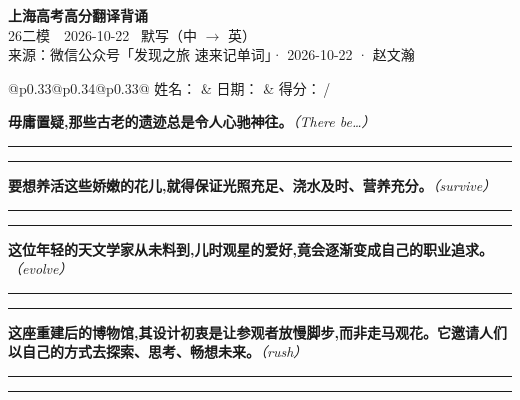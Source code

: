 \documentclass[11pt,a4paper]{article}
\newcommand{\num}[1]{\makebox[1.9em][r]{#1.}\hspace{0.3em}}
\newcommand{\wline}{\noindent\rule{\linewidth}{0.4pt}}
\newcommand{\prompt}[1]{\emph{\textcolor{tipblue}{\small（#1）}}}
\begin{document}
\pagestyle{plain}
\begin{center}
{\LARGE\bfseries 上海高考高分翻译背诵 }\\[0.25em]
{\large 26二模　2026-10-22 \quad\ 默写（中 $\to$ 英）}\\[0.35em]
{\footnotesize 来源：微信公众号「发现之旅 速来记单词」· 2026-10-22 · 赵文瀚}
\end{center}

\vspace{0.4em}
\noindent\begin{tabular}{@{}p{0.33\textwidth}@{}p{0.34\textwidth}@{}p{0.33\textwidth}@{}}
姓名：\underline{\hspace{2.0cm}} & 日期：\underline{\hspace{2.0cm}} & 得分：\underline{\hspace{1.4cm}}\,/ \\
\end{tabular}

\vspace{0.5em}

\vspace{0.8em}
\num{1}\textbf{毋庸置疑,那些古老的遗迹总是令人心驰神往。}\prompt{There be…}

\vspace{0.3em}

\wline\vspace{0.3em}
\wline

\num{2}\textbf{要想养活这些娇嫩的花儿,就得保证光照充足、浇水及时、营养充分。}\prompt{survive}

\vspace{0.3em}

\wline\vspace{0.3em}
\wline

\num{3}\textbf{这位年轻的天文学家从未料到,儿时观星的爱好,竟会逐渐变成自己的职业追求。}\prompt{evolve}

\vspace{0.3em}

\wline\vspace{0.3em}
\wline

\num{4}\textbf{这座重建后的博物馆,其设计初衷是让参观者放慢脚步,而非走马观花。它邀请人们以自己的方式去探索、思考、畅想未来。}\prompt{rush}

\vspace{0.3em}

\wline\vspace{0.3em}
\wline
\end{document}
